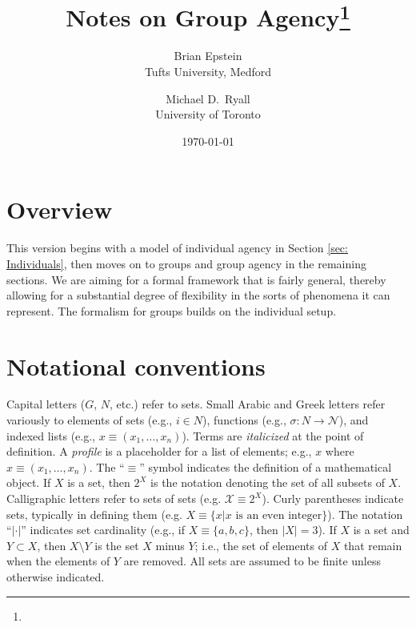 \documentclass[
11pt,
titlepage,
reqno,
]{article}%
\theoremstyle{definition}
\begin{document}
	
	\title{Notes on Group Agency\thanks{}
	}
	\author
	{
		Brian Epstein \\Tufts University, Medford
		\and 
		Michael D.\ Ryall \\University of Toronto 
	}
	\date{\today}
	\maketitle
	
	
	
	\def\baselinestretch{1.5}\small\normalsize
	
	\newpage
	\section{Overview}

	This version begins with a model of individual agency in Section \ref{sec: Individuals}, then moves on to groups and group agency in the remaining sections. 
	We are aiming for a  formal framework that is fairly general, thereby allowing for a substantial degree of flexibility in the sorts of phenomena it can represent.  
	The formalism for groups builds on the individual setup. 
	
	\section{Notational conventions}
	Capital letters ($G$, $N$, etc.) refer to sets.  
	Small Arabic and Greek letters refer variously to elements of sets (e.g., $i\in N$), functions (e.g., $\sigma:N\rightarrow \mathcal{N}$), and indexed lists (e.g., $x\equiv(x_1,\ldots,x_n)$). 
	Terms  are \textit{italicized} at the point of definition.  
	A \textit{profile} is a placeholder for a list of elements; e.g., $x$ where $x\equiv(x_1,\ldots,x_n)$. 
	The ``$\equiv$'' symbol indicates the definition of a mathematical object. 
	If $X$ is a set, then $2^X$ is the notation denoting the set of all subsets of $X$. Calligraphic letters refer to sets of sets (e.g. $\mathcal{X}\equiv 2^X$). 
	Curly parentheses indicate sets, typically in defining them (e.g. $X\equiv\{x|x\text{ is an even integer}\}$). 
	The notation ``$|\cdot|$'' indicates set cardinality (e.g., if $X\equiv\{a,b,c\}$, then $|X|=3$). 
	If $X$ is a set and $Y\subset X$, then $X\setminus Y$ is the set $X$ minus $Y$; i.e., the set of elements of $X$ that  remain when the elements of $Y$ are removed. 
	All sets are assumed to be finite unless otherwise indicated.
	
\end{document}
